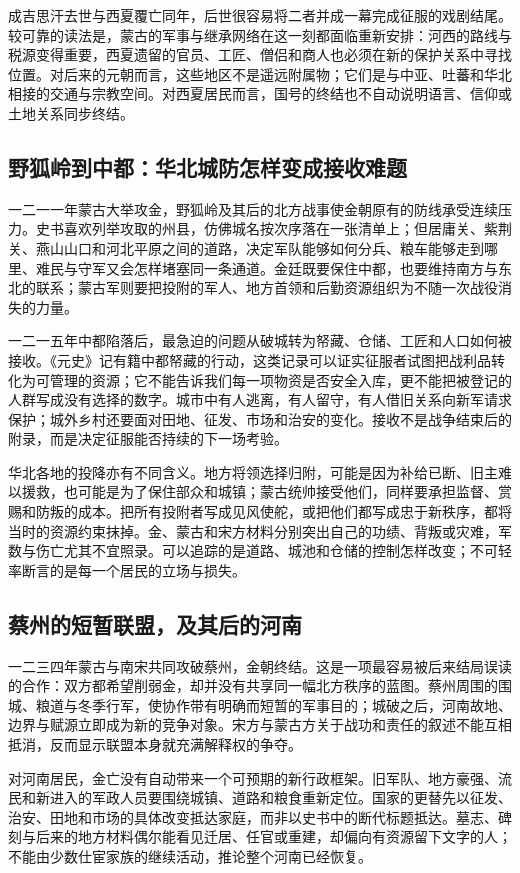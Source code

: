 成吉思汗去世与西夏覆亡同年，后世很容易将二者并成一幕完成征服的戏剧结尾。较可靠的读法是，蒙古的军事与继承网络在这一刻都面临重新安排：河西的路线与税源变得重要，西夏遗留的官员、工匠、僧侣和商人也必须在新的保护关系中寻找位置。对后来的元朝而言，这些地区不是遥远附属物；它们是与中亚、吐蕃和华北相接的交通与宗教空间。对西夏居民而言，国号的终结也不自动说明语言、信仰或土地关系同步终结。

\subsection{野狐岭到中都：华北城防怎样变成接收难题}

一二一一年蒙古大举攻金，野狐岭及其后的北方战事使金朝原有的防线承受连续压力。史书喜欢列举攻取的州县，仿佛城名按次序落在一张清单上；但居庸关、紫荆关、燕山山口和河北平原之间的道路，决定军队能够如何分兵、粮车能够走到哪里、难民与守军又会怎样堵塞同一条通道。金廷既要保住中都，也要维持南方与东北的联系；蒙古军则要把投附的军人、地方首领和后勤资源组织为不随一次战役消失的力量。

一二一五年中都陷落后，最急迫的问题从破城转为帑藏、仓储、工匠和人口如何被接收。《元史》记有籍中都帑藏的行动，这类记录可以证实征服者试图把战利品转化为可管理的资源；它不能告诉我们每一项物资是否安全入库，更不能把被登记的人群写成没有选择的数字。城市中有人逃离，有人留守，有人借旧关系向新军请求保护；城外乡村还要面对田地、征发、市场和治安的变化。接收不是战争结束后的附录，而是决定征服能否持续的下一场考验。

华北各地的投降亦有不同含义。地方将领选择归附，可能是因为补给已断、旧主难以援救，也可能是为了保住部众和城镇；蒙古统帅接受他们，同样要承担监督、赏赐和防叛的成本。把所有投附者写成见风使舵，或把他们都写成忠于新秩序，都将当时的资源约束抹掉。金、蒙古和宋方材料分别突出自己的功绩、背叛或灾难，军数与伤亡尤其不宜照录。可以追踪的是道路、城池和仓储的控制怎样改变；不可轻率断言的是每一个居民的立场与损失。

\subsection{蔡州的短暂联盟，及其后的河南}

一二三四年蒙古与南宋共同攻破蔡州，金朝终结。这是一项最容易被后来结局误读的合作：双方都希望削弱金，却并没有共享同一幅北方秩序的蓝图。蔡州周围的围城、粮道与冬季行军，使协作带有明确而短暂的军事目的；城破之后，河南故地、边界与赋源立即成为新的竞争对象。宋方与蒙古方关于战功和责任的叙述不能互相抵消，反而显示联盟本身就充满解释权的争夺。

对河南居民，金亡没有自动带来一个可预期的新行政框架。旧军队、地方豪强、流民和新进入的军政人员要围绕城镇、道路和粮食重新定位。国家的更替先以征发、治安、田地和市场的具体改变抵达家庭，而非以史书中的断代标题抵达。墓志、碑刻与后来的地方材料偶尔能看见迁居、任官或重建，却偏向有资源留下文字的人；不能由少数仕宦家族的继续活动，推论整个河南已经恢复。

